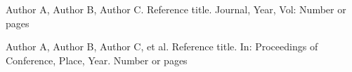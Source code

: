 \documentclass{SCIS2023cn}
\begin{document}


\begin{thebibliography}{99}

 Author A, Author B, Author C. Reference title. Journal, Year, Vol: Number or pages

 Author A, Author B, Author C, et al. Reference title. In: Proceedings of Conference, Place, Year. Number or pages

\end{thebibliography}



\makeentitle


\end{document}
